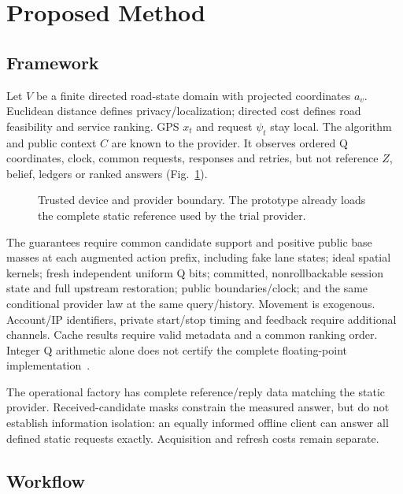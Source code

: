 \section{Proposed Method}\label{sec:method}
\subsection{Framework}\label{sec:system}
Let $V$ be a finite directed road-state domain with projected coordinates $a_v$.
Euclidean distance defines privacy/localization; directed cost defines road
feasibility and service ranking. GPS $x_t$ and request $\psi_t$ stay local.
The algorithm and public context $C$ are known to the provider.
It observes ordered Q coordinates, clock, common requests, responses
and retries, but not reference $Z$, belief, ledgers or ranked answers
(Fig.~\ref{fig:system}).

\begin{figure}[!ht]\centering
\resizebox{\columnwidth}{!}{}
\caption{Trusted device and provider boundary. The prototype already loads the
complete static reference used by the trial provider.}\label{fig:system}
\end{figure}

The guarantees require common candidate support and positive public base masses
at each augmented action prefix, including fake lane states; ideal spatial
kernels; fresh independent uniform Q bits; committed, nonrollbackable session
state and full upstream restoration; public boundaries/clock; and the same
conditional provider law at the same query/history. Movement is exogenous.
Account/IP identifiers, private start/stop timing and feedback require additional
channels. Cache results require valid metadata and a common ranking order.
Integer Q arithmetic alone does not certify the complete floating-point
implementation~\cite{mironov}.

The operational factory has complete reference/reply data matching the static
provider. Received-candidate masks constrain the measured answer, but do not
establish information isolation: an equally informed offline client can answer
all defined static requests exactly. Acquisition and refresh costs remain separate.

\subsection{Workflow}
